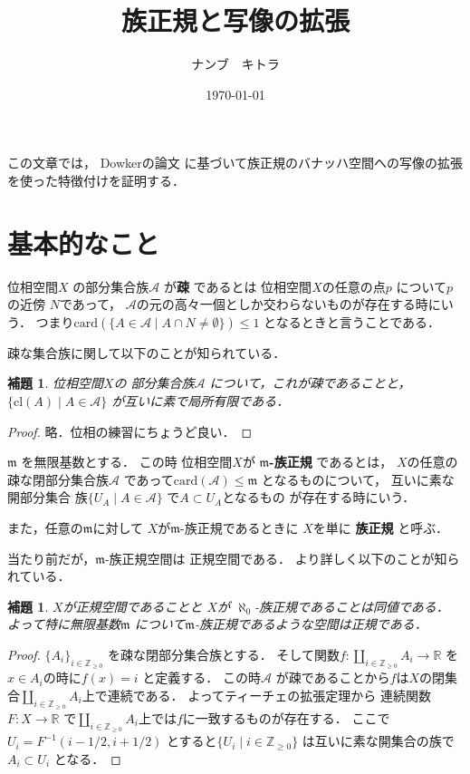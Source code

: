 \documentclass[leqno, a4paper, 12pt]{jsarticle}
\title{族正規と写像の拡張}
\author{ナンブ　キトラ}
\date{\today}
\newtheorem{lem}[thm]{補題}
\newcommand{\zz}{\mathbb{Z}}
\newcommand{\rr}{\mathbb{R}}
\newcommand{\card}{\mathrm{card}}
\newcommand{\cl}{\mathrm{cl}}
\begin{document}
\maketitle
この文章では，
Dowkerの論文
\cite{dow}に基づいて族正規のバナッハ空間への写像の拡張を使った特徴付けを証明する．


\section{基本的なこと}
位相空間$X$
の部分集合族$\mathcal{A}$
が\textbf{疎}
であるとは
位相空間$X$の任意の点$p$
について$p$の近傍
$N$であって，
$\mathcal{A}$の元の高々一個としか交わらないものが存在する時にいう．
つまり$\card(\{A\in \mathcal{A}\mid A\cap N\neq \emptyset\})\le 1$
となるときと言うことである．

疎な集合族に関して以下のことが知られている．
\begin{lem}
位相空間$X$の
部分集合族$\mathcal{A}$
について，これが疎であることと，
$\{\cl(A)\mid A\in \mathcal{A}\}$
が互いに素で局所有限である．
\end{lem}
\begin{proof}
略．位相の練習にちょうど良い．
\end{proof}


$\mathfrak{m}$
を無限基数とする．
この時
位相空間$X$が
\textbf{$\mathfrak{m}$-族正規}
であるとは，
$X$の任意の疎な閉部分集合族$\mathcal{A}$
であって$\card(\mathcal{A})\le \mathfrak{m}$
となるものについて，
互いに素な開部分集合
族$\{U_{A}\mid A\in \mathcal{A}\}$
で$A\subset U_{A}$となるもの
が存在する時にいう．

また，任意の$\mathfrak{m}$に対して
$X$が$\mathfrak{m}$-族正規であるときに
$X$を単に
\textbf{族正規}
と呼ぶ．

当たり前だが，$\mathfrak{m}$-族正規空間は
正規空間である．
より詳しく以下のことが知られている．


\begin{lem}
$X$が正規空間であることと
$X$が
$\aleph_{0}$-族正規であることは同値である．
よって特に無限基数$\mathfrak{m}$
について$\mathfrak{m}$-族正規であるような空間は正規である．
\end{lem}
\begin{proof}
$\{A_{i}\}_{i\in \zz_{\ge 0}}$
を疎な閉部分集合族とする．
そして関数$f\colon \coprod_{i\in \zz_{\ge 0}}A_{i}\to \rr$
を$x\in A_{i}$の時に$f(x)=i$
と定義する．
この時$\mathcal{A}$
が疎であることから$f$は$X$の閉集合$\coprod_{i\in \zz_{\ge 0}}A_{i}$上で連続である．
よってティーチェの拡張定理から
連続関数$F\colon X\to \rr$
で$\coprod_{i\in \zz_{\ge 0}}A_{i}$上では$f$に一致するものが存在する．
ここで
$U_{i}=F^{-1}(i-1/2, i+1/2)$
とすると$\{U_{i}\mid i\in \zz_{\ge 0}\}$
は互いに素な開集合の族で$A_{i}\subset U_{i}$
となる．
\end{proof}
\end{document}
